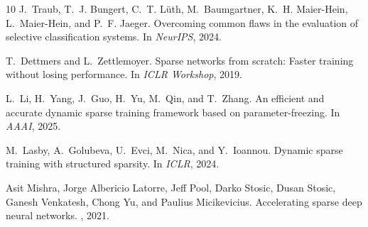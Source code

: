 \documentclass[letterpaper]{article} %
\begin{document}
\begin{thebibliography}{10}
J.~Traub, T.~J. Bungert, C.~T. L{\"u}th, M.~Baumgartner, K.~H. Maier-Hein, L.~Maier-Hein, and P.~F. Jaeger.
\newblock Overcoming common flaws in the evaluation of selective classification systems.
\newblock In {\em NeurIPS}, 2024.

T.~Dettmers and L.~Zettlemoyer.
\newblock Sparse networks from scratch: Faster training without losing performance.
\newblock In {\em ICLR Workshop}, 2019.

L.~Li, H.~Yang, J.~Guo, H.~Yu, M.~Qin, and T.~Zhang.
\newblock An efficient and accurate dynamic sparse training framework based on parameter-freezing.
\newblock In {\em AAAI}, 2025.

M.~Lasby, A.~Golubeva, U.~Evci, M.~Nica, and Y.~Ioannou.
\newblock Dynamic sparse training with structured sparsity.
\newblock In {\em ICLR}, 2024.

Asit Mishra, Jorge Albericio Latorre, Jeff Pool, Darko Stosic, Dusan Stosic, Ganesh Venkatesh, Chong Yu, and Paulius Micikevicius.
\newblock Accelerating sparse deep neural networks.
, 2021.

\end{thebibliography}
\end{document}
